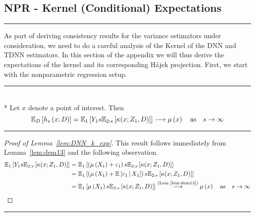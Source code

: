 \subsection{NPR - Kernel (Conditional) Expectations}\label{subsec:KernelCondExp}
\hrule
As part of deriving consistency results for the variance estimators under consideration, we need to do a careful analysis of the Kernel of the DNN and TDNN estimators.
In this section of the appendix we will thus derive the expectations of the kernel and its corresponding H\'ajek projection.
First, we start with the nonparametric regression setup.
\vspace{0.5cm}
\hrule

\begin{lem}\label{lem:DNN_k_exp}\mbox{}\\*
	Let $x$ denote a point of interest.
	Then
	\begin{equation}
		\mathbb{E}_D\left[h_s\left(x; D\right)\right]
		= \mathbb{E}_{1}\left[Y_1 s \mathbb{E}_{2:s}\left[\kappa(x; Z_1, D)\right]\right]
		  \longrightarrow \mu\left(x\right) \quad \text{as} \quad s \rightarrow \infty
	\end{equation}
\end{lem}
\hrule
\begin{proof}[Proof of Lemma~\ref{lem:DNN_k_exp}]
	This result follows immediately from Lemma~\ref{lem:dem13} and the following observation.
    \begin{equation}
		\begin{aligned}
			\mathbb{E}_{1}\left[Y_1 s \mathbb{E}_{2:s}\left[\kappa(x; Z_1, D)\right]\right]
			 & = \mathbb{E}_{1}\left[\left(\mu\left(X_1\right) + \varepsilon_1\right) s \mathbb{E}_{2:s}\left[\kappa(x; Z_1, D)\right]\right]                                   \\
			 & = \mathbb{E}_{1}\left[\left(\mu\left(X_1\right) + \mathbb{E}\left[\varepsilon_1 \, \middle| \, X_1\right]\right) s \mathbb{E}_{2:s}\left[\kappa(x; Z_1, D)\right]\right] \\
			 & = \mathbb{E}_{1}\left[\mu\left(X_1\right) s \mathbb{E}_{2:s}\left[\kappa(x; Z_1, D)\right]\right]
			\overset{\text{(Lem~\ref{lem:dem13})}}{\longrightarrow} \mu\left(x\right)
			\quad \text{as} \quad s \rightarrow \infty
		\end{aligned}
	\end{equation}
\end{proof}

\hrule

